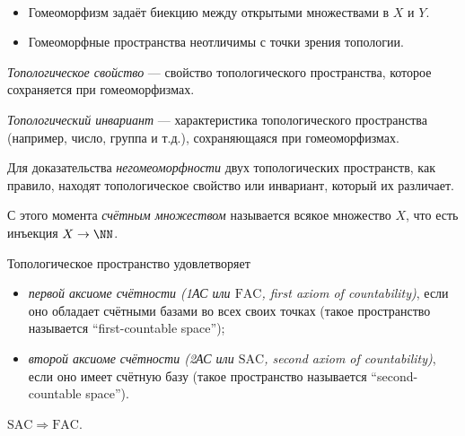 \documentclass[12pt,a4paper]{article}
\newcommand{\FAC}{\ensuremath{\mathrm{FAC}}\xspace}
\newcommand{\SAC}{\ensuremath{\mathrm{SAC}}\xspace}
\begin{document}
    \begin{remark}\ 
        \begin{itemize}
            \item Гомеоморфизм задаёт биекцию между открытыми множествами в $X$ и $Y$.
            \item Гомеоморфные пространства неотличимы с точки зрения топологии.
        \end{itemize}
    \end{remark}

    \begin{definition}
        \emph{Топологическое свойство} --- свойство топологического пространства, которое сохраняется при гомеоморфизмах.

        \emph{Топологический инвариант} --- характеристика топологического пространства (например, число, группа и т.д.), сохраняющаяся при гомеоморфизмах.
    \end{definition}

    \begin{remark*}
        Для доказательства \emph{негомеоморфности} двух топологических пространств, как правило, находят топологическое свойство или инвариант, который их различает.
    \end{remark*}

    \begin{remark*}
        С этого момента \emph{счётным множеством} называется всякое множество $X$, что есть инъекция $X \to \NN$. 
    \end{remark*}

    \begin{definition}
        Топологическое пространство удовлетворяет
        \begin{itemize}
            \item \emph{первой аксиоме счётности (1АС или \FAC , first axiom of countability)}, если оно обладает счётными базами во всех своих точках (такое пространство называется ``first-countable space'');
            \item \emph{второй аксиоме счётности (2АС или \SAC , second axiom of countability)}, если оно имеет счётную базу (такое пространство называется ``second-countable space'').
        \end{itemize}
    \end{definition}

    \begin{theorem}\label{AC_conseq_theorem}
        $\SAC \Rightarrow \FAC$.
    \end{theorem}
\end{document}
